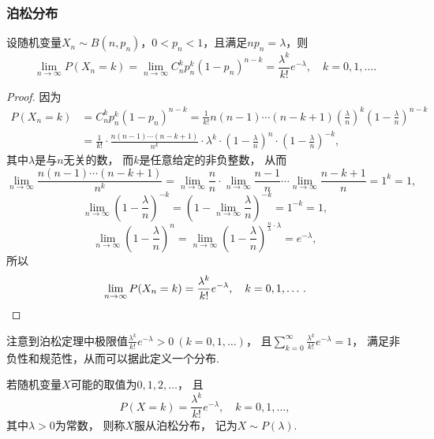 \subsubsection{泊松分布}
\begin{theorem}[泊松定理]
设随机变量\(X_n \sim B(n,p_n)\)，\(0 < p_n < 1\)，且满足\(n p_n = \lambda\)，则\begin{equation}
	\lim_{n\to\infty} P(X_n=k)
	= \lim_{n\to\infty} C_n^k p_n^k (1-p_n)^{n-k}
	= \frac{\lambda^k}{k!} e^{-\lambda},
	\quad k=0,1,\dotsc.
\end{equation}
\begin{proof}
因为\begin{align*}
	P(X_n=k) &= C_n^k p_n^k (1-p_n)^{n-k}
	= \frac{1}{k!} n(n-1)\dotsm(n-k+1)
	\left(\frac{\lambda}{n}\right)^k
	\left(1-\frac{\lambda}{n}\right)^{n-k} \\
	&= \frac{1}{k!}
	\cdot \frac{n(n-1)\dotsm(n-k+1)}{n^k}
	\cdot \lambda^k
	\cdot \left(1-\frac{\lambda}{n}\right)^n
	\cdot \left(1-\frac{\lambda}{n}\right)^{-k},
\end{align*}
其中\(\lambda\)是与\(n\)无关的数，
而\(k\)是任意给定的非负整数，
从而\[
	\lim_{n\to\infty} \frac{n(n-1)\dotsm(n-k+1)}{n^k}
	= \lim_{n\to\infty} \frac{n}{n}
	\cdot \lim_{n\to\infty} \frac{n-1}{n}
	\dotsm \lim_{n\to\infty} \frac{n-k+1}{n}
	= 1^k = 1,
\]\[
	\lim_{n\to\infty} \left(1-\frac{\lambda}{n}\right)^{-k}
	= \left(1-\lim_{n\to\infty} \frac{\lambda}{n}\right)^{-k}
	= 1^{-k} = 1,
\]\[
	\lim_{n\to\infty} \left(1-\frac{\lambda}{n}\right)^n
	= \lim_{n\to\infty}
	\left(1-\frac{\lambda}{n}\right)^{\frac{n}{\lambda} \cdot \lambda}
	= e^{-\lambda},
\]
所以\[
	\lim_{n\to\infty} P(X_n=k)
	= \frac{\lambda^k}{k!} e^{-\lambda},
	\quad k=0,1,\dotsc.
	\qedhere
\]
\end{proof}
\end{theorem}

注意到泊松定理中极限值\(\frac{\lambda^k}{k!} e^{-\lambda} > 0\ (k=0,1,\dotsc)\)，
且\(\sum_{k=0}^\infty \frac{\lambda^k}{k!} e^{-\lambda} = 1\)，
满足非负性和规范性，从而可以据此定义一个分布.

\begin{definition}
若随机变量\(X\)可能的取值为\(0,1,2,\dotsc\)，
且\begin{equation}\label{equation:随机变量及其分布.泊松分布的分布律}
	P(X=k) = \frac{\lambda^k}{k!} e^{-\lambda},
	\quad k=0,1,\dotsc,
\end{equation}
其中\(\lambda > 0\)为常数，
则称\(X\)服从泊松分布，
记为\(X \sim P(\lambda)\).
\end{definition}

